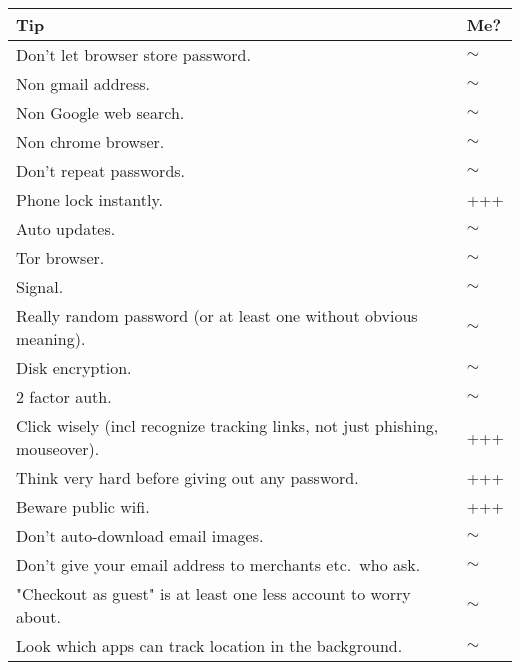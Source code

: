 \documentclass{tufte-handout}
\begin{document}
\begin{tabular}{p{5in}l}

\textbf{Tip} & \textbf{Me?} \\
\hline

Don't let browser store password. & $\sim$ \\

Non gmail address. & $\sim$ \\

Non Google web search. & $\sim$ \\

Non chrome browser. & $\sim$ \\

Don't repeat passwords. & $\sim$ \\

Phone lock instantly. & +++ \\

Auto updates. & $\sim$ \\

Tor browser. & $\sim$ \\

Signal. & $\sim$ \\

Really random password (or at least one without obvious meaning). & $\sim$ \\

Disk encryption. & $\sim$ \\

2 factor auth. & $\sim$ \\

Click wisely (incl recognize tracking links, not just phishing, mouseover). & +++ \\

Think very hard before giving out any password. & +++ \\

Beware public wifi. & +++ \\

Don't auto-download email images. & $\sim$ \\

Don't give your email address to merchants etc.\ who ask. & $\sim$ \\

"Checkout as guest" is at least one less account to worry about. & $\sim$ \\

Look which apps can track location in the background. & $\sim$ \\


\end{tabular}
\end{document}
